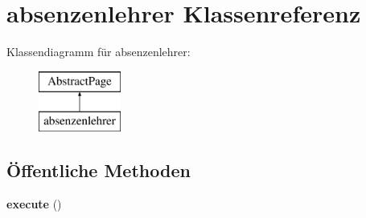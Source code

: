 \hypertarget{classabsenzenlehrer}{}\section{absenzenlehrer Klassenreferenz}
\label{classabsenzenlehrer}
Klassendiagramm für absenzenlehrer\+:\begin{figure}[H]
\begin{center}
\leavevmode
\includegraphics[height=2.000000cm]{classabsenzenlehrer}
\end{center}
\end{figure}
\subsection*{Öffentliche Methoden}
\begin{DoxyCompactItemize}
\item 
\mbox{\label{classabsenzenlehrer_aebe3cd1365f680f8f6e0b5c110280471}} 
{\bfseries execute} ()
\end{DoxyCompactItemize}
